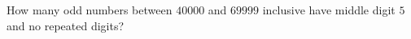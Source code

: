 How many odd numbers between $40000$ and $69999$ inclusive have middle digit $5$ and no repeated digits?
